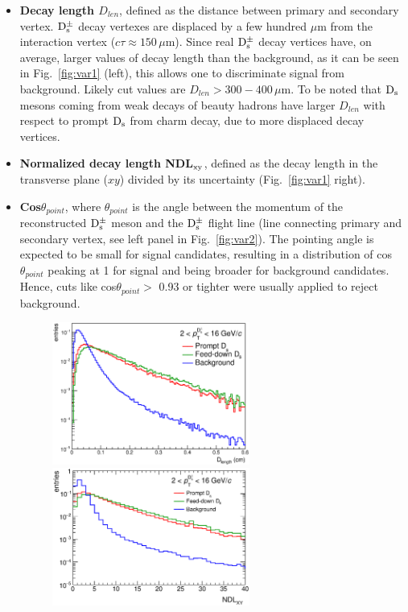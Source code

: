 \begin{itemize}
\item \textbf{Decay length $D_{len}$}, defined as the distance between
 primary and secondary vertex. ${\rm D_s^{\pm}}$ decay vertexes are displaced by
  a few hundred $\mu$m from the interaction vertex ($c\tau \approx 150\, \mu$m). Since real ${\rm D_s^{\pm}}$ 
  decay vertices have, on average, larger values of decay length than the
   background, as it can be seen in Fig.~\ref{fig:var1} (left), 
   this allows one to discriminate signal from background. 
   Likely cut values are $D_{len} > 300-400\, \mu $m. 
   To be noted that ${\rm D_s}$ mesons coming from weak decays of beauty hadrons have larger $D_{len}$
   with respect to prompt ${\rm D_s}$ from charm decay, due to more displaced decay vertices.
\item \textbf{Normalized decay length NDL$_{\rm xy}$}, defined as the decay length 
in the transverse plane ($xy$) divided by its uncertainty (Fig.~\ref{fig:var1} right).
\item \textbf{Cos$\theta_{point}$}, where $\theta_{point}$ is the angle
 between the momentum of the reconstructed ${\rm D_s^{\pm}}$ meson and the 
 ${\rm D_s^{\pm}}$ flight line (line connecting primary and secondary vertex, see
  left panel in Fig.~\ref{fig:var2}). The pointing angle is expected to be small for signal 
  candidates, resulting in a distribution of cos$\theta_{point}$ peaking at 1 for 
  signal and being broader for background candidates. Hence, cuts like 
  cos$\theta_{point} >$ 0.93 or tighter were usually applied to reject background.
\begin{figure}[!t]
\centering
\includegraphics[width=6.5cm]{FigCap4/DL.eps}
\includegraphics[width=6.5cm]{FigCap4/NDLxy.eps}

\end{figure}
\end{itemize}
